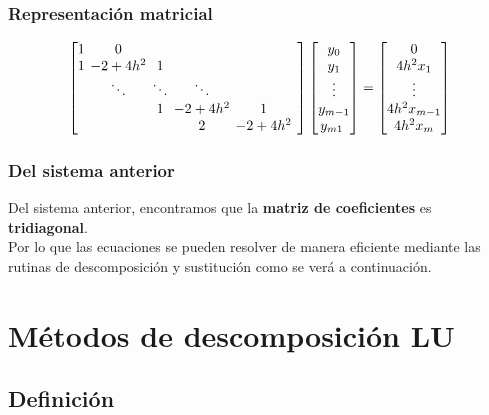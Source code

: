 \documentclass[12pt]{beamer}
\begin{document}
\begin{frame}
\frametitle{Representación matricial}
\begin{align*}
\begingroup %
\setlength\arraycolsep{2pt}
\begin{bmatrix}
1 & 0 & & & & \\
1 & -2 + 4 h^{2} & 1 & & \\
 & \ddots & \ddots & \ddots & \\
 & & 1 & -2 + 4 h^{2} & 1 \\
 & & & 2 & -2 + 4 h^{2}
\end{bmatrix}
\endgroup
\begin{bmatrix}
y_{0} \\
y_{1} \\
\vdots \\
y_{m-1} \\
y_{m1} \
\end{bmatrix}
=
\begin{bmatrix}
0 \\
4 h^{2} x_{1} \\
\vdots \\
4 h^{2} x_{m-1} \\
4 h^{2} x_{m}
\end{bmatrix}
\end{align*}
\end{frame}
\begin{frame}
\frametitle{Del sistema anterior}
Del sistema anterior, encontramos que la \textbf{\textcolor{bondiblue}{matriz de coeficientes}} es \textbf{\textcolor{cadet}{tridiagonal}}.
\\
\bigskip
\pause
Por lo que las ecuaciones se pueden resolver de manera eficiente mediante las rutinas de descomposición y sustitución como se verá a continuación.
\end{frame}

\section{Métodos de descomposición LU}
\subsection{Definición}
\end{document}

